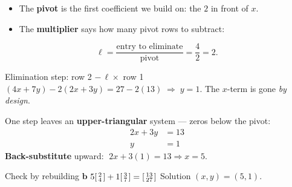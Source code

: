 \documentclass[aspectratio=169, 11pt]{beamer}
\newcommand{\bb}{\mathbf{b}}
\begin{document}
\begin{frame}[t, plain]
  \begin{itemize}
    \setlength{\itemsep}{5pt}
    \item The \textbf{pivot} is the first coefficient we build on: the $2$ in front of $x$.
    \item The \textbf{multiplier} says how many pivot rows to subtract:
  \end{itemize}
  \[
    \ell = \frac{\text{entry to eliminate}}{\text{pivot}} = \frac{4}{2} = 2.
  \]
  \begin{block}{Elimination step: row 2 $-\,\ell\times$ row 1}
    $(4x+7y) - 2(2x+3y) = 27 - 2(13) \;\Longrightarrow\; y = 1.$ \quad The $x$-term is gone \emph{by design}.
  \end{block}
\end{frame}

\begin{frame}[t, plain]
  One step leaves an \textbf{upper-triangular} system --- zeros below the pivot:
  \[
    \begin{aligned}
      2x + 3y &= 13 \\
      y &= 1
    \end{aligned}
  \]
  \textbf{Back-substitute} upward: $\;2x + 3(1) = 13 \Rightarrow x = 5.$
  \begin{block}{Check by rebuilding $\bb$}
    $5\begin{bsmallmatrix} 2\\4 \end{bsmallmatrix} + 1\begin{bsmallmatrix} 3\\7 \end{bsmallmatrix} = \begin{bsmallmatrix} 13\\27 \end{bsmallmatrix}$ \checkmark \quad Solution $(x,y)=(5,1)$.
  \end{block}
\end{frame}
\end{document}
